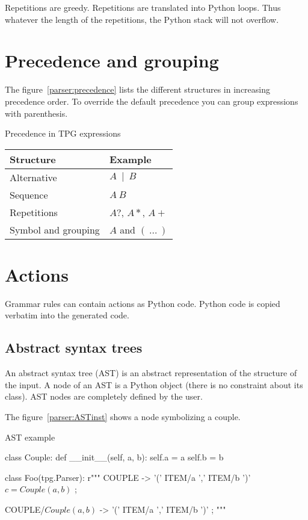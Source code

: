 Repetitions are greedy.
Repetitions are translated into Python loops.
Thus whatever the length of the repetitions, the Python stack will not overflow. 

\section{Precedence and grouping}

The figure~\ref{parser:precedence} lists the different structures in increasing precedence order.
To override the default precedence you can group expressions with parenthesis.

\begin{tableau}
\caption{Precedence in TPG expressions}                         \label{parser:precedence}
\begin{tabular}{| l | l |}
\hline
    Structure           & Example \\
\hline
\hline
    Alternative         & $A~\mid~B$ \\
\hline
    Sequence            & $A~B$ \\
\hline
    Repetitions         & $A?$, $A*$, $A+$ \\
\hline
    Symbol and grouping & $A$ and $(~\ldots~)$ \\
\hline
\end{tabular}
\end{tableau}

\section{Actions}

Grammar rules can contain actions as Python code.
Python code is copied verbatim into the generated code.

\subsection{Abstract syntax trees}                              \label{parser:AST}

An abstract syntax tree (AST) is an abstract representation of the structure of the input.
A node of an AST is a Python object (there is no constraint about its class).
AST nodes are completely defined by the user.

The figure~\ref{parser:ASTinst} shows a node symbolizing a couple.

\begin{code}
\caption{AST example}                                           \label{parser:ASTinst}
\begin{verbatimtab}[4]

class Couple:
    def __init__(self, a, b):
        self.a = a
        self.b = b

class Foo(tpg.Parser):
    r"""
    COUPLE -> '(' ITEM/a ',' ITEM/b ')' $ c = Couple(a,b) $ ;

    COUPLE/$Couple(a,b)$ -> '(' ITEM/a ',' ITEM/b ')' ;
    """
\end{verbatimtab}
\end{code}

